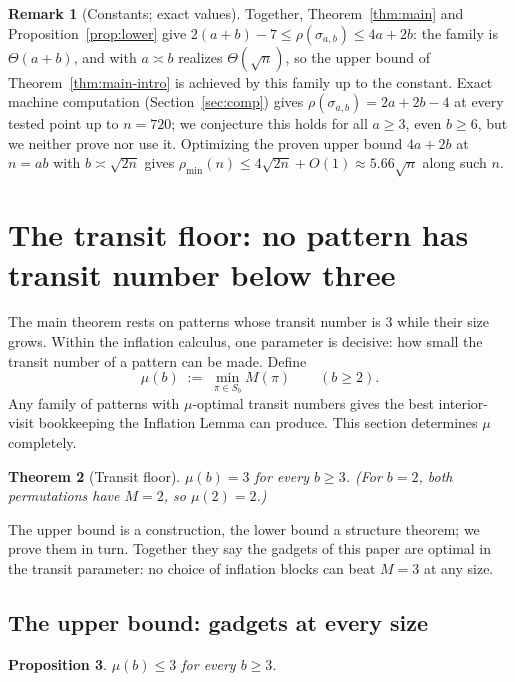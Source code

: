 \documentclass[11pt]{article}
\newtheorem{theorem}{Theorem}[section]
\newtheorem{proposition}[theorem]{Proposition}
\theoremstyle{definition}
\newtheorem{remark}[theorem]{Remark}
\newcommand{\pmin}{\rho_{\min}}
\begin{document}
\begin{remark}[Constants; exact values]\label{rem:constants}
Together, Theorem~\ref{thm:main} and Proposition~\ref{prop:lower} give
$2(a+b) - 7 \le \rho(\sigma_{a,b}) \le 4a + 2b$: the family is $\Theta(a + b)$, and with
$a \asymp b$ realizes $\Theta(\sqrt n)$, so the upper bound of
Theorem~\ref{thm:main-intro} is achieved by this family up to the constant. Exact
machine computation (Section~\ref{sec:comp}) gives $\rho(\sigma_{a,b}) = 2a + 2b - 4$ at
every tested point up to $n = 720$; we conjecture this holds for all $a \ge 3$, even
$b \ge 6$, but we neither prove nor use it. Optimizing the proven upper bound $4a + 2b$
at $n = ab$ with $b \asymp \sqrt{2n}$ gives $\pmin(n) \le 4\sqrt{2n} + O(1) \approx
5.66\sqrt n$ along such $n$.
\end{remark}

\section{The transit floor: no pattern has transit number below three}
\label{sec:floor}

The main theorem rests on patterns whose transit number is $3$ while their size grows.
Within the inflation calculus, one parameter is decisive: how small the transit number
of a pattern can be made. Define
\[
  \mu(b) \;:=\; \min_{\pi \in S_b} M(\pi) \qquad (b \ge 2).
\]
Any family of patterns with $\mu$-optimal transit numbers gives the best interior-visit
bookkeeping the Inflation Lemma can produce. This section determines $\mu$ completely.

\begin{theorem}[Transit floor]\label{thm:floor}
$\mu(b) = 3$ for every $b \ge 3$. (For $b = 2$, both permutations have $M = 2$, so
$\mu(2) = 2$.)
\end{theorem}

The upper bound is a construction, the lower bound a structure theorem; we prove them
in turn. Together they say the gadgets of this paper are optimal in the transit
parameter: no choice of inflation blocks can beat $M = 3$ at any size.

\subsection{The upper bound: gadgets at every size}

\begin{proposition}\label{prop:floor-upper}
$\mu(b) \le 3$ for every $b \ge 3$.
\end{proposition}
\end{document}
